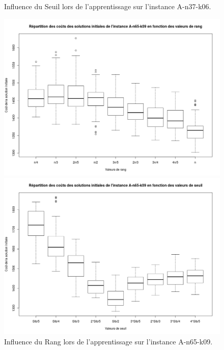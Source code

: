 \documentclass[a4paper,11pt]{article}%
\begin{document}
\begin{figure}
\begin{minipage}[c]{.46\linewidth}
        \caption{Influence du Seuil lors de l'apprentissage sur l'instance A-n37-k06.}
        \label{InfSA3706}
    \end{minipage}
    
    \begin{minipage}[c]{.46\linewidth}
        \centering
        \includegraphics[scale=0.25]{InfluenceRangA6509}
        
        \caption{Influence du Rang lors de l'apprentissage sur l'instance A-n65-k09.}
        \label{InfRA6509}
    \end{minipage}
    \hfill%
    \begin{minipage}[c]{.46\linewidth}
        \centering
        \includegraphics[scale=0.25]{InfluenceSeuilA6509}
        

\end{minipage}
\end{figure}
\end{document}
